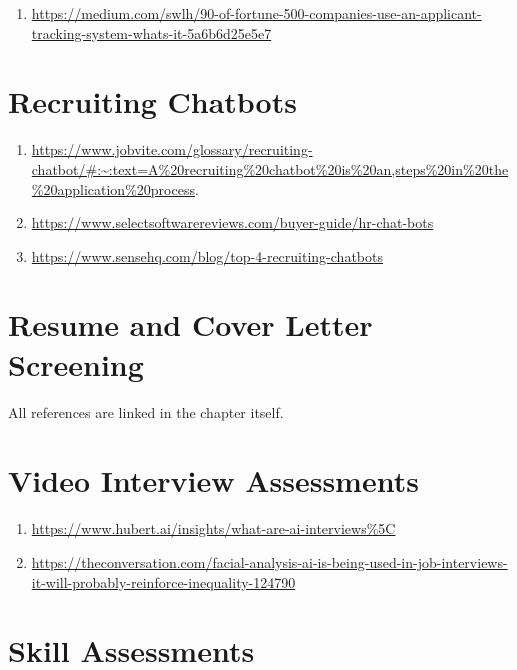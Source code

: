 \documentclass[
]{book}
\providecommand{\tightlist}{%
  \setlength{\itemsep}{0pt}\setlength{\parskip}{0pt}}
\begin{document}
\begin{enumerate}
\def\labelenumi{\arabic{enumi}.}
\tightlist
\item
  \url{https://medium.com/swlh/90-of-fortune-500-companies-use-an-applicant-tracking-system-whats-it-5a6b6d25e5e7}
\end{enumerate}

\hypertarget{recruiting-chatbots-1}{%
\section{Recruiting Chatbots}\label{recruiting-chatbots-1}}

\begin{enumerate}
\def\labelenumi{\arabic{enumi}.}
\item
  \url{https://www.jobvite.com/glossary/recruiting-chatbot/\#:~:text=A\%20recruiting\%20chatbot\%20is\%20an,steps\%20in\%20the\%20application\%20process}.
\item
  \url{https://www.selectsoftwarereviews.com/buyer-guide/hr-chat-bots}
\item
  \url{https://www.sensehq.com/blog/top-4-recruiting-chatbots}
\end{enumerate}

\hypertarget{resume-and-cover-letter-screening-1}{%
\section{Resume and Cover Letter Screening}\label{resume-and-cover-letter-screening-1}}

All references are linked in the chapter itself.

\hypertarget{video-interview-assessments-1}{%
\section{Video Interview Assessments}\label{video-interview-assessments-1}}

\begin{enumerate}
\def\labelenumi{(\arabic{enumi})}
\item
  \url{https://www.hubert.ai/insights/what-are-ai-interviews\%5C}
\item
  \url{https://theconversation.com/facial-analysis-ai-is-being-used-in-job-interviews-it-will-probably-reinforce-inequality-124790}
\end{enumerate}

\hypertarget{skill-assessments-1}{%
\section{Skill Assessments}\label{skill-assessments-1}}
\end{document}
